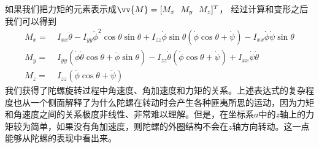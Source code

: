 \documentclass[11pt]{article}
\begin{document}

如果我们把力矩的元素表示成$\vv{M} = [M_x \ \ M_y \ \ M_z]^T$，
经过计算和变形之后我们可以得到
\begin{align}\label{eqn:torquetoangular}
M_x = &	\ I_{xx}\ddot{\theta} - I_{yy}\dot{\phi}^2\cos\theta\sin\theta + I_{zz}\dot{\phi}\sin\theta(\dot{\phi}\cos\theta + \dot{\psi}) - I_{xx}\dot{\phi}\dot{\psi}\sin\theta \\ 
M_y = & \ I_{yy}(\dot{\phi}\dot{\theta}\cos\theta + \ddot{\phi}\sin\theta) - I_{zz}\dot{\theta}(\dot{\phi}\cos\theta + \dot{\psi}) + I_{xx}\dot{\psi}\dot{\theta}	\\
M_z = & \ I_{zz}(\ddot{\phi}\cos\theta + \ddot{\psi}) %
\end{align}
我们获得了陀螺旋转过程中角速度、角加速度和力矩的关系。上述表达式的复杂程度也从一个侧面解释了为什么陀螺在转动时会产生各种匪夷所思的运动，因为力矩和角速度之间的关系极度非线性、非常难以理解。但是，在坐标系$a$中的$z$轴上的力矩较为简单，如果没有角加速度，则陀螺的外圈结构不会在$z$轴方向转动。这一点能够从陀螺的表现中看出来。
\end{document}
